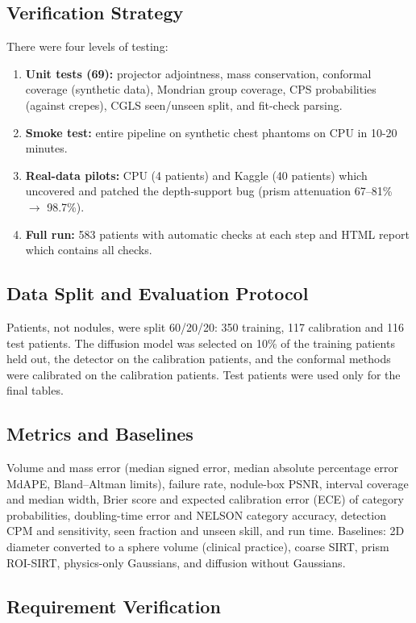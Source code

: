 \subsection{Verification Strategy}
 There were four levels of testing:
\begin{enumerate}
  \item \textbf{Unit tests (69):} projector adjointness, mass conservation, conformal coverage (synthetic data), Mondrian group coverage, CPS probabilities (against crepes), CGLS seen/unseen split, and fit-check parsing.\item \textbf{Smoke test:} entire pipeline on synthetic chest phantoms on CPU in 10-20 minutes.\item \textbf{Real-data pilots:} CPU (4 patients) and Kaggle (40 patients) which uncovered and patched the depth-support bug (prism attenuation 67--81\% $\rightarrow$ 98.7\%).\item \textbf{Full run:} 583 patients with automatic checks at each step and HTML report which contains all checks.
\end{enumerate}

\subsection{Data Split and Evaluation Protocol}
 Patients, not nodules, were split 60/20/20: 350 training, 117 calibration and 116 test patients. The diffusion model was selected on 10\% of the training patients held out, the detector on the calibration patients, and the conformal methods were calibrated on the calibration patients. Test patients were used only for the final tables.

\subsection{Metrics and Baselines}
 Volume and mass error (median signed error, median absolute percentage error MdAPE, Bland--Altman limits), failure rate, nodule-box PSNR, interval coverage and median width, Brier score and expected calibration error (ECE) of category probabilities, doubling-time error and NELSON category accuracy, detection CPM and sensitivity, seen fraction and unseen skill, and run time. Baselines: 2D diameter converted to a sphere volume (clinical practice), coarse SIRT, prism ROI-SIRT, physics-only Gaussians, and diffusion without Gaussians.

\subsection{Requirement Verification}

